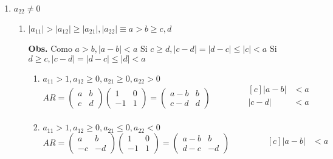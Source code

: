 \documentclass{article}
\newcommand\tab[1][0.6cm]{\hspace*{#1}}
\newcommand\nl{\newline\tab}
\begin{document}
	\begin{enumerate}
		\item $ a_{22} \neq 0$
			\begin{enumerate}
				
			\item \label{1}  
			$|a_{11}| > |a_{12}| \geq |a_{21}|, |a_{22}|   \equiv a > b \geq c, d$ \nl
			
			\textbf{Obs.} \nl Como $a > b, |a - b| < a$ \nl
							  Si $c \geq d, |c - d| = |d - c|\leq |c| < a$
							  \nl 
			Si  $d \geq c, |c - d| = |d - c|\leq |d| < a$
			\begin{enumerate}
				\item  $a_{11} > 1, a_{12} \geq 0, a_{21} \geq 0, a_{22} > 0 $\nl
				$$
				AR = 
				\begin{pmatrix}
				a & b \\
				c & d 
				\end{pmatrix} 
				\begin{pmatrix}
				1 & 0 \\
				-1 & 1 
				\end{pmatrix} = 
				\begin{pmatrix}
				a-b & b \\
				c-d & d 
				\end{pmatrix}
				\qquad\qquad
				\begin{aligned}[c]
				|a - b| &< a\\
				|c - d| &< a\\
				\end{aligned}
				$$
				\item $a_{11} > 1, a_{12} \geq 0, a_{21} \leq 0, a_{22} < 0$ \nl
				$$
				AR = 
				\begin{pmatrix}
				a & b \\
				-c & -d 
				\end{pmatrix} 
				\begin{pmatrix}
				1 & 0 \\
				-1 & 1 
				\end{pmatrix} = 
				\begin{pmatrix}
				a-b & b \\
				d-c & -d 
				\end{pmatrix}
				\qquad\qquad
				\begin{aligned}[c]
				|a - b| &< a\\

\end{aligned}$$
\end{enumerate}
\end{enumerate}
\end{enumerate}
\end{document}
